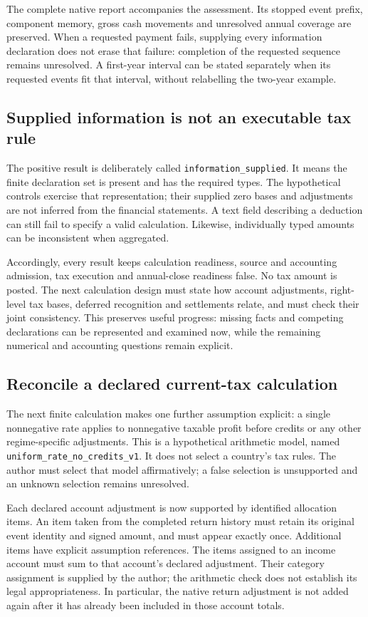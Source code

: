 The complete native report accompanies the assessment. Its stopped event
prefix, component memory, gross cash movements and unresolved annual coverage
are preserved. When a requested payment fails, supplying every information
declaration does not erase that failure: completion of the requested sequence
remains unresolved. A first-year interval can be stated separately when its
requested events fit that interval, without relabelling the two-year example.

\subsection{Supplied information is not an executable tax rule}

The positive result is deliberately called \texttt{information\_supplied}.
It means the finite declaration set is present and has the required types.
The hypothetical controls exercise that representation; their supplied zero
bases and adjustments are not inferred from the financial statements. A text
field describing a deduction can still fail to specify a valid calculation.
Likewise, individually typed amounts can be inconsistent when aggregated.

Accordingly, every result keeps calculation readiness, source and accounting
admission, tax execution and annual-close readiness false. No tax amount is
posted. The next calculation design must state how account adjustments,
right-level tax bases, deferred recognition and settlements relate, and must
check their joint consistency. This preserves useful progress: missing facts
and competing declarations can be represented and examined now, while the
remaining numerical and accounting questions remain explicit.

\subsection{Reconcile a declared current-tax calculation}

The next finite calculation makes one further assumption explicit: a single
nonnegative rate applies to nonnegative taxable profit before credits or any
other regime-specific adjustments. This is a hypothetical arithmetic model,
named \texttt{uniform\_rate\_no\_credits\_v1}. It does not select a country's
tax rules. The author must select that model affirmatively; a false selection
is unsupported and an unknown selection remains unresolved.

Each declared account adjustment is now supported by identified allocation
items. An item taken from the completed return history must retain its original
event identity and signed amount, and must appear exactly once. Additional
items have explicit assumption references. The items assigned to an income
account must sum to that account's declared adjustment. Their category assignment
is supplied by the author; the arithmetic check does not establish its legal
appropriateness. In particular, the native return adjustment is not added again
after it has already been included in those account totals.

